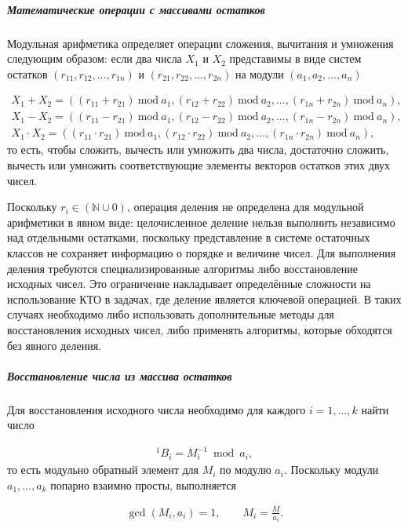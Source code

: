 \documentclass{crm-article}
\begin{document}
\subparagraph{Математические операции с массивами остатков}

Модульная арифметика \cite{omondi2007residue, soderstrand1986residue} определяет операции сложения, вычитания и умножения следующим образом: если два числа $X_1$ и $X_2$ представимы в виде систем остатков $(r_{11}, r_{12}, ..., r_{1n}) $ и $(r_{21}, r_{22}, ..., r_{2n})$ на модули $(a_1, a_2, ..., a_n)$

\begin{align} 
	X_1 + X_2  = ((r_{11} + r_{21})\ \mathrm{mod}\ a_1, (r_{12} + r_{22})\ \mathrm{mod}\ a_2, ..., (r_{1n} + r_{2n})\ \mathrm{mod}\ a_n), \\
	X_1 - X_2 = ((r_{11} - r_{21})\ \mathrm{mod}\ a_1, (r_{12} - r_{22})\ \mathrm{mod}\ a_2, ..., (r_{1n} - r_{2n})\ \mathrm{mod}\ a_n), \\
	X_1 \cdot X_2 = ((r_{11} \cdot r_{21})\ \mathrm{mod}\ a_1, (r_{12} \cdot r_{22})\ \mathrm{mod}\ a_2, ..., (r_{1n} \cdot r_{2n})\ \mathrm{mod}\ a_n), 
\end{align}
то есть, чтобы сложить, вычесть или умножить два числа, достаточно сложить, вычесть или умножить соответствующие элементы векторов остатков этих двух чисел.

Поскольку $r_i \in (\mathbb{N} \cup 0)$, операция деления не определена для модульной арифметики в явном виде: целочисленное деление нельзя выполнить независимо над отдельными остатками, поскольку представление в системе остаточных классов не сохраняет информацию о порядке и величине чисел. Для выполнения деления требуются специализированные алгоритмы либо восстановление исходных чисел. Это ограничение накладывает определённые сложности на использование КТО в задачах, где деление является ключевой операцией. В таких случаях необходимо либо использовать дополнительные методы для восстановления исходных чисел, либо применять алгоритмы, которые обходятся без явного деления.

\subparagraph{Восстановление числа из массива остатков}

Для восстановления исходного числа необходимо для каждого $i=1,\ldots,k$ найти число

\begin{gather}
    ^1B_i=M_i^{-1}\bmod a_i,
\end{gather}
то есть модульно обратный элемент для $M_i$ по модулю $a_i$. Поскольку модули $a_1,\ldots,a_k$ попарно взаимно просты, выполняется

\begin{gather}
    \gcd(M_i,a_i)=1,
    \qquad
    M_i=\frac{M}{a_i}.
\end{gather}
\end{document}

